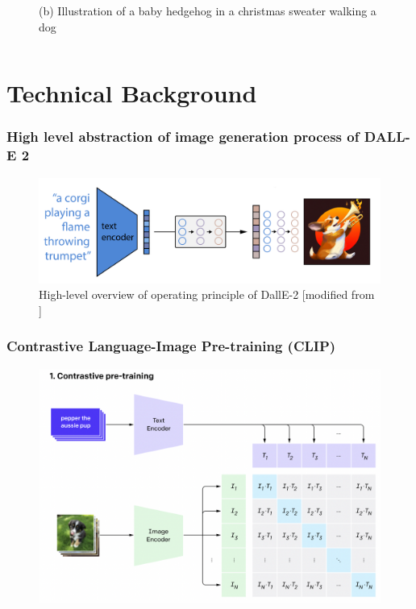\documentclass[
	11pt, compress%
]{beamer}
\begin{document}
\begin{frame}
\begin{columns}[c]
\begin{column}{0.5\textwidth}
\begin{figure}
				\caption{(b) Illustration of a baby hedgehog in a christmas sweater walking a dog \cite{DBLP:journals/corr/abs-2102-12092}} 
			\end{figure}
		\end{column}
	\end{columns}
\end{frame}


\section{Technical Background}

\begin{frame}
	\frametitle{High level abstraction of image generation process of DALL-E 2}
	\begin{figure}
		\includegraphics[width=0.85\linewidth]{Images/highLevel.png}
		\caption{High-level overview of operating principle of DallE-2 [modified from \cite{https://doi.org/10.48550/arxiv.2204.06125}]}
	\end{figure}
\end{frame}

\begin{frame}
	\frametitle{Contrastive Language-Image Pre-training (CLIP)}
	\begin{figure}
		\includegraphics[width=0.83\linewidth]{Images/CLIP1.png}
		\cite{CLIP}
	\end{figure}
\end{frame}
\end{document}
